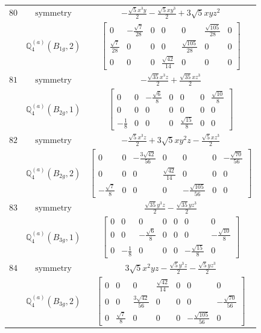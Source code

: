 \documentclass[fleqn,8pt,landscape]{jsarticle}
\begin{document}
\begin{longtable}{ccc}
$ 80 $ & $ \text{symmetry} $ & $ - \frac{\sqrt{5} x^{3} y}{2} - \frac{\sqrt{5} x y^{3}}{2} + 3 \sqrt{5} x y z^{2} $ \\
$  $ & $ \mathbb{Q}_{4}^{(a)}(B_{1g},2) $ & $ \begin{bmatrix} 0 & - \frac{\sqrt{7}}{28} & 0 & 0 & 0 & \frac{\sqrt{105}}{28} & 0 \\ \frac{\sqrt{7}}{28} & 0 & 0 & 0 & \frac{\sqrt{105}}{28} & 0 & 0 \\ 0 & 0 & 0 & \frac{\sqrt{42}}{14} & 0 & 0 & 0 \end{bmatrix} $ \\ \hline
$ 81 $ & $ \text{symmetry} $ & $ - \frac{\sqrt{35} x^{3} z}{2} + \frac{\sqrt{35} x z^{3}}{2} $ \\
$  $ & $ \mathbb{Q}_{4}^{(a)}(B_{2g},1) $ & $ \begin{bmatrix} 0 & 0 & - \frac{\sqrt{6}}{8} & 0 & 0 & 0 & \frac{\sqrt{10}}{8} \\ 0 & 0 & 0 & 0 & 0 & 0 & 0 \\ - \frac{1}{8} & 0 & 0 & 0 & \frac{\sqrt{15}}{8} & 0 & 0 \end{bmatrix} $ \\ \hline
$ 82 $ & $ \text{symmetry} $ & $ - \frac{\sqrt{5} x^{3} z}{2} + 3 \sqrt{5} x y^{2} z - \frac{\sqrt{5} x z^{3}}{2} $ \\
$  $ & $ \mathbb{Q}_{4}^{(a)}(B_{2g},2) $ & $ \begin{bmatrix} 0 & 0 & - \frac{3 \sqrt{42}}{56} & 0 & 0 & 0 & - \frac{\sqrt{70}}{56} \\ 0 & 0 & 0 & \frac{\sqrt{42}}{14} & 0 & 0 & 0 \\ - \frac{\sqrt{7}}{8} & 0 & 0 & 0 & - \frac{\sqrt{105}}{56} & 0 & 0 \end{bmatrix} $ \\ \hline
$ 83 $ & $ \text{symmetry} $ & $ \frac{\sqrt{35} y^{3} z}{2} - \frac{\sqrt{35} y z^{3}}{2} $ \\
$  $ & $ \mathbb{Q}_{4}^{(a)}(B_{3g},1) $ & $ \begin{bmatrix} 0 & 0 & 0 & 0 & 0 & 0 & 0 \\ 0 & 0 & - \frac{\sqrt{6}}{8} & 0 & 0 & 0 & - \frac{\sqrt{10}}{8} \\ 0 & - \frac{1}{8} & 0 & 0 & 0 & - \frac{\sqrt{15}}{8} & 0 \end{bmatrix} $ \\ \hline
$ 84 $ & $ \text{symmetry} $ & $ 3 \sqrt{5} x^{2} y z - \frac{\sqrt{5} y^{3} z}{2} - \frac{\sqrt{5} y z^{3}}{2} $ \\
$  $ & $ \mathbb{Q}_{4}^{(a)}(B_{3g},2) $ & $ \begin{bmatrix} 0 & 0 & 0 & \frac{\sqrt{42}}{14} & 0 & 0 & 0 \\ 0 & 0 & \frac{3 \sqrt{42}}{56} & 0 & 0 & 0 & - \frac{\sqrt{70}}{56} \\ 0 & \frac{\sqrt{7}}{8} & 0 & 0 & 0 & - \frac{\sqrt{105}}{56} & 0 \end{bmatrix} $ \\ \hline

\end{longtable}
\end{document}
